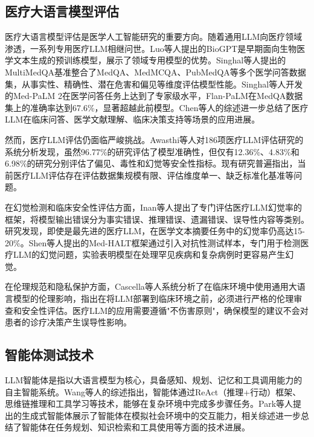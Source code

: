 \subsection{医疗大语言模型评估}

医疗大语言模型评估是医学人工智能研究的重要方向。随着通用LLM向医疗领域渗透，一系列专用医疗LLM相继问世。Luo等人\cite{luo2022biogpt}提出的BioGPT是早期面向生物医学文本生成的预训练模型，展示了领域专用模型的优势。Singhal等人\cite{singhal2025nature}提出的MultiMedQA基准整合了MedQA、MedMCQA、PubMedQA等多个医学问答数据集，从事实性、精确性、潜在危害和偏见等维度评估模型性能。Singhal等人\cite{singhal2025nature}开发的Med-PaLM 2在医学问答任务上达到了专家级水平，Flan-PaLM在MedQA数据集上的准确率达到67.6\%，显著超越此前模型。Chen等人\cite{thapa2024large}的综述进一步总结了医疗LLM在临床问答、医学文献理解、临床决策支持等场景的应用进展。

然而，医疗LLM评估仍面临严峻挑战。Awasthi等人\cite{awasthi2025human,liu2024comprehensive}对186项医疗LLM评估研究的系统分析发现，虽然96.77\%的研究评估了模型准确性，但仅有12.36\%、4.83\%和6.98\%的研究分别评估了偏见、毒性和幻觉等安全性指标。现有研究普遍指出，当前医疗LLM评估存在评估数据集规模有限、评估维度单一、缺乏标准化基准等问题。

在幻觉检测和临床安全性评估方面，Inan等人\cite{inan2024safety}提出了专门评估医疗LLM幻觉率的框架，将模型输出错误分为事实错误、推理错误、遗漏错误、误导性内容等类别。研究发现，即使是最先进的医疗LLM，在医学文本摘要任务中的幻觉率仍高达15-20\%。Shen等人\cite{pal2023med}提出的Med-HALT框架通过引入对抗性测试样本，专门用于检测医疗LLM的幻觉问题，实验表明模型在处理罕见疾病和复杂病例时更容易产生幻觉。

在伦理规范和隐私保护方面，Cascella等人\cite{esmai2025ethical}系统分析了在临床环境中使用通用大语言模型的伦理影响，指出在将LLM部署到临床环境之前，必须进行严格的伦理审查和安全性评估。医疗LLM的应用需要遵循"不伤害原则"，确保模型的建议不会对患者的诊疗决策产生误导性影响。

\subsection{智能体测试技术}

LLM智能体是指以大语言模型为核心，具备感知、规划、记忆和工具调用能力的自主智能系统。Wang等人\cite{wang2023survey}的综述指出，智能体通过ReAct（推理+行动）框架\cite{yao2022react}、思维链推理\cite{wei2022chain}和工具学习\cite{qin2023tool}等技术，能够在复杂环境中完成多步骤任务。Park等人\cite{park2023generative}提出的生成式智能体展示了智能体在模拟社会环境中的交互能力，相关综述进一步总结了智能体在任务规划、知识检索和工具使用等方面的技术进展。

